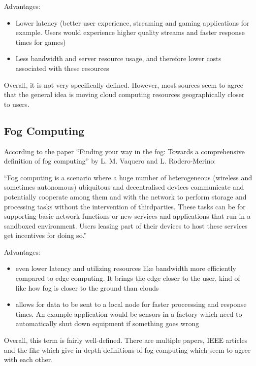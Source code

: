 Advantages:
\begin{itemize}
  \item Lower latency (better user experience, streaming and gaming applications
    for example. Users would experience higher quality streams and faster
    response times for games)
  \item Less bandwidth and server resource usage, and therefore lower costs
    associated with these resources
\end{itemize}

Overall, it is not very specifically defined. However, most sources seem to
agree that the general idea is moving cloud computing resources geographically
closer to users.

\subsection{Fog Computing}
According to the paper  “Finding your way in the
fog: Towards a comprehensive definition of fog computing” by L. M. Vaquero and
L. Rodero-Merino: 
\begin{displayquote}
  ``Fog computing is a scenario where a huge number of heterogeneous (wireless and sometimes autonomous) ubiquitous
and decentralised devices communicate and potentially cooperate among them and with the network to perform storage and processing tasks without the intervention of thirdparties. These tasks can be for supporting basic network
functions or new services and applications that run in a
sandboxed environment. Users leasing part of their devices
to host these services get incentives for doing so.''
\end{displayquote}


Advantages:
\begin{itemize}
  \item even lower latency and utilizing resources like bandwidth more
    efficiently compared to edge computing. It
    brings the edge closer to the user, kind of like how fog is closer to the
    ground than clouds
  \item allows for data to be sent to a local node for faster proccessing and
    response times. An example application would be sensors in a factory which need to automatically shut down
    equipment if something goes wrong
\end{itemize}

Overall, this term is fairly well-defined. There are multiple papers, IEEE
articles and the like which give in-depth definitions of fog computing which
seem to agree with each other. 

